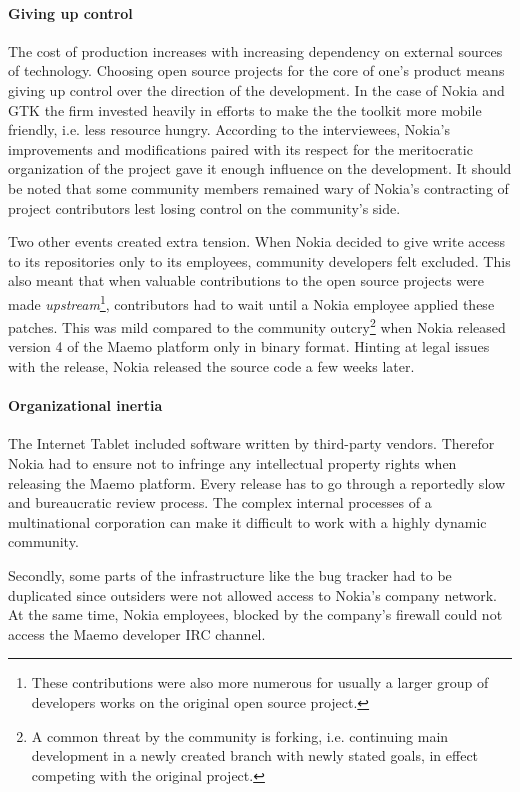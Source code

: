 \documentclass[a4paper]{scrartcl}
\begin{document}
\paragraph{Giving up control}
The cost of production increases with increasing dependency on external sources of technology.
Choosing open source projects for the core of one's product means giving up control over the direction of the development.
In the case of Nokia and GTK the firm invested heavily in efforts to make the the toolkit more mobile friendly, i.e. less resource hungry.
According to the interviewees, Nokia's improvements and modifications paired with its respect for the meritocratic organization of the project gave it enough influence on the development.
It should be noted that some community members remained wary of Nokia's contracting of  project contributors lest losing control on the community's side.

Two other events created extra tension.
When Nokia decided to give write access to its repositories only to its employees, community developers felt excluded.
This also meant that when valuable contributions to the open source projects were made \emph{upstream}\footnote{These contributions were also more numerous for usually a larger group of developers works on the original open source project.}, contributors had to wait until a Nokia employee applied these patches.
This was mild compared to the community outcry\footnote{A common threat by the community is  forking, i.e. continuing main development in a newly created branch with newly stated goals, in effect competing with the original project.} when Nokia released version 4 of the Maemo platform only in binary format.
Hinting at legal issues with the release, Nokia released the source code a few weeks later.

\paragraph{Organizational inertia}
The Internet Tablet included software written by third-party vendors.
Therefor Nokia had to ensure not to infringe any intellectual property rights when releasing the Maemo platform.
Every release has to go through a reportedly slow and bureaucratic review process.
The complex internal processes of a multinational corporation can make it difficult to work with a highly dynamic community.

Secondly, some parts of the infrastructure like the bug tracker had to be duplicated since outsiders were not allowed access to Nokia's company network.
At the same time, Nokia employees, blocked by the company's firewall could not access the Maemo developer IRC channel.
\end{document}
